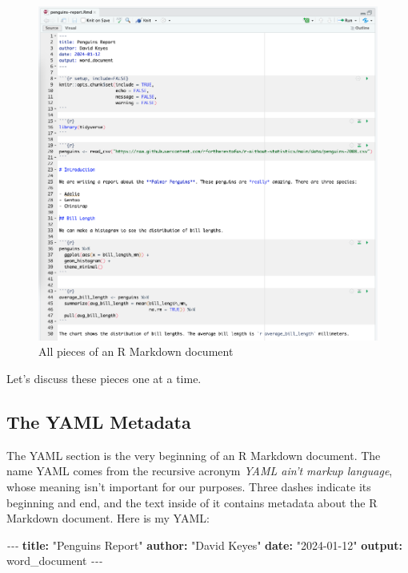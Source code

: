 \documentclass[
]{book}
\newenvironment{Shaded}{\begin{snugshade}}{\end{snugshade}}
\newcommand{\AttributeTok}[1]{\textcolor[rgb]{0.13,0.29,0.53}{#1}}
\newcommand{\FunctionTok}[1]{\textcolor[rgb]{0.13,0.29,0.53}{\textbf{#1}}}
\newcommand{\KeywordTok}[1]{\textcolor[rgb]{0.13,0.29,0.53}{\textbf{#1}}}
\newcommand{\PreprocessorTok}[1]{\textcolor[rgb]{0.56,0.35,0.01}{\textit{#1}}}
\newcommand{\StringTok}[1]{\textcolor[rgb]{0.31,0.60,0.02}{#1}}
\begin{document}
\begin{figure}
\includegraphics[width=1\linewidth]{assets/rmarkdown-pieces} \caption{All pieces of an R Markdown document}\label{fig:rmarkdown-pieces}
\end{figure}

Let's discuss these pieces one at a time.

\hypertarget{the-yaml-metadata}{%
\subsection*{The YAML Metadata}\label{the-yaml-metadata}}

The YAML section is the very beginning of an R Markdown document. The name YAML comes from the recursive acronym \emph{YAML ain't markup language}, whose meaning isn't important for our purposes. Three dashes indicate its beginning and end, and the text inside of it contains metadata about the R Markdown document. Here is my YAML:

\begin{Shaded}
\begin{Highlighting}[]
\PreprocessorTok{{-}{-}{-}}
\FunctionTok{title}\KeywordTok{:}\AttributeTok{ }\StringTok{"Penguins Report"}
\FunctionTok{author}\KeywordTok{:}\AttributeTok{ }\StringTok{"David Keyes"}
\FunctionTok{date}\KeywordTok{:}\AttributeTok{ }\StringTok{"2024{-}01{-}12"}
\FunctionTok{output}\KeywordTok{:}\AttributeTok{ word\_document}
\PreprocessorTok{{-}{-}{-}}
\end{Highlighting}
\end{Shaded}
\end{document}
